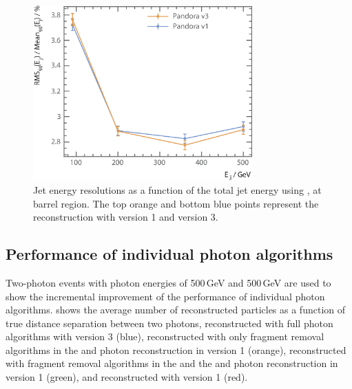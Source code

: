 \begin{figure}[tbph]
\centering
\includegraphics[width=0.75\textwidth]{photon/JERnew2}
\caption[Jet energy resolution as a function of the di-jet energy]
{Jet energy resolutions as a function of the total jet energy using \eeZuds, at barrel region. The top orange and bottom blue points represent the  reconstruction with \pandora version 1 and version 3.}
\label{fig:photonJER}
\end{figure}


\subsection{Performance of individual photon algorithms}





Two-photon events with photon energies of  500\,GeV and 500\,GeV are  used to show the incremental improvement of the performance of individual photon algorithms.  shows the average number of reconstructed particles as a function of true distance separation between two photons, reconstructed with full photon algorithms with \pandora version 3 (blue), reconstructed with only fragment removal algorithms in the \ECAL and photon reconstruction in  \pandora version 1 (orange), reconstructed with fragment removal algorithms in the \ECAL and the \HCAL and photon reconstruction in  \pandora version 1 (green), and reconstructed with \pandora version 1 (red).

